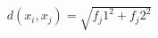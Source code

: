 \documentclass[preview]{standalone}
\begin{document}
\begin{align*}
d(x_i, x_j)= \sqrt{f_j1^2 + f_j2^2}
\end{align*}
\end{document}

